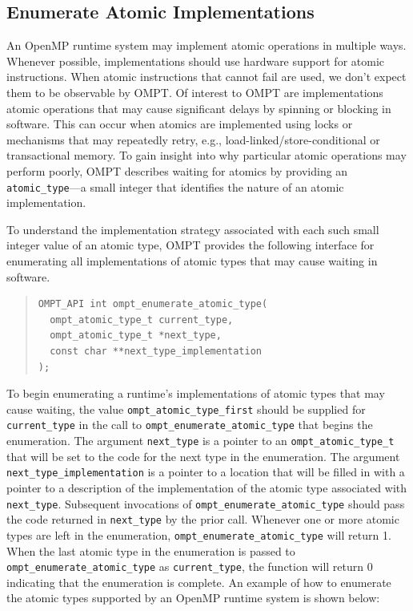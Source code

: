 \documentclass{article}
\begin{document}
 \subsection{Enumerate Atomic Implementations}
 \label{ompt_enumerate_atomic_type}
 
An OpenMP runtime system may implement atomic operations in multiple ways. Whenever possible, implementations should use hardware support for atomic instructions. When atomic instructions that cannot fail are used, we don't expect them to be observable by OMPT.
Of interest to OMPT are implementations atomic operations that may cause significant delays by spinning or blocking in software. This can occur when atomics are implemented using locks or mechanisms that may repeatedly retry, e.g., load-linked/store-conditional or transactional memory. To gain insight into why particular atomic operations may perform poorly,  OMPT describes waiting for atomics by providing an \verb|atomic_type|---a small integer that identifies the nature of an atomic implementation.

To understand the implementation strategy associated with each such small integer value of an atomic type, 
OMPT provides
the following interface for enumerating all implementations of atomic types that may cause waiting in software.

\begin{quote}
\begin{verbatim}
OMPT_API int ompt_enumerate_atomic_type(
  ompt_atomic_type_t current_type, 
  ompt_atomic_type_t *next_type, 
  const char **next_type_implementation
);
\end{verbatim}
\end{quote}

\noindent
To begin enumerating a runtime's implementations of atomic types that may cause waiting,
the value \verb|ompt_atomic_type_first| should be supplied for \verb|current_type| in the call to \verb|ompt_enumerate_atomic_type| that begins the enumeration.
The argument \verb|next_type| is a pointer to an \verb|ompt_atomic_type_t| that will be set to the code for the next type in the enumeration.
The argument \verb|next_type_implementation| is a pointer to a location that will be filled in with a pointer to a description of the implementation of the atomic type associated with \verb|next_type|. 
Subsequent invocations of \verb|ompt_enumerate_atomic_type| should pass the code returned in \verb|next_type| by the prior call.
Whenever one or more atomic types are left in the enumeration, \verb|ompt_enumerate_atomic_type| will return 1.
When the last atomic type in the enumeration is passed to \verb|ompt_enumerate_atomic_type| as \verb|current_type|, 
the function will return 0 indicating that the enumeration is complete.
An example of how to enumerate the atomic types supported by an OpenMP runtime system is shown below:
\end{document}
